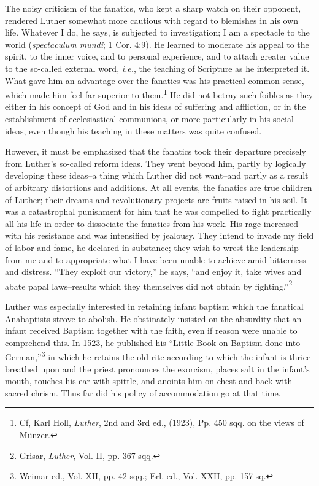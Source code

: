 The noisy criticism of the fanatics, who kept a sharp watch on
their opponent, rendered Luther somewhat more cautious with regard to
blemishes in his own life. Whatever I do, he says, is subjected
to investigation; I am a spectacle to the world (\textit{spectaculum mundi};
1 Cor. 4:9). He learned to moderate his appeal to the spirit, to
the inner voice, and to personal experience, and to attach greater
value to the so-called external word, \textit{i.e.}, the teaching of Scripture
as he interpreted it. What gave him an advantage over the fanatics
was his practical common sense, which made him feel far superior to
them.\footnote{Cf, Karl Holl, \textit{Luther}, 2nd and 3rd ed., (1923), Pp. 450 sqq. on the views of Münzer.}
He did not betray such foibles as they either in his concept
of God and in his ideas of suffering and affliction, or in the
establishment of ecclesiastical communions, or more particularly in his
social ideas, even though his teaching in these matters was quite confused.

However, it must be emphasized that the fanatics took their departure
precisely from Luther’s so-called reform ideas. They went beyond him,
partly by logically developing these ideas--a thing which
Luther did not want--and partly as a result of arbitrary distortions
and additions. At all events, the fanatics are true children of Luther;
their dreams and revolutionary projects are fruits raised in his soil.
It was a catastrophal punishment for him that he was compelled to
fight practically all his life in order to dissociate the fanatics from
his work. His rage increased with his resistance and was intensified
by jealousy. They intend to invade my field of labor and fame, he
declared in substance; they wish to wrest the leadership from me and
to appropriate what I have been unable to achieve amid bitterness and
distress. “They exploit our victory,” he says, “and enjoy it, take wives
and abate papal laws--results which they themselves did not obtain
by fighting.”\footnote{Grisar, \textit{Luther}, Vol. II, pp. 367 sqq.}

Luther was especially interested in retaining infant baptism which
the fanatical Anabaptists strove to abolish. He obstinately insisted
on the absurdity that an infant received Baptism together with the
faith, even if reason were unable to comprehend this. In 1523, he
published his “Little Book on Baptism done into German,”\footnote
{Weimar ed., Vol. XII, pp. 42 sqq.; Erl. ed., Vol. XXII, pp. 157 sq.}
in which he retains the old rite according to which the infant is thrice
breathed upon and the priest pronounces the exorcism, places salt
in the infant’s mouth, touches his ear with spittle, and anoints him
on chest and back with sacred chrism. Thus far did his policy of
accommodation go at that time.

